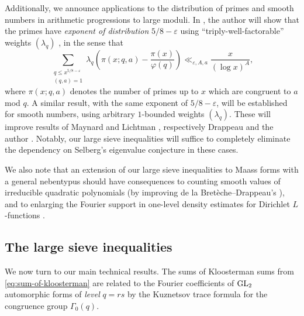 \documentclass[reqno,11pt]{amsart}
\theoremstyle{remark}
\newtheorem*{remark}{Remark}
\numberwithin{equation}{section}
\newcommand{\GL}{\textnormal{GL}}
\newcommand{\eps}{\varepsilon}
\begin{document}
Additionally, we announce applications to the distribution of primes and smooth numbers in arithmetic progressions to large moduli. In \cite{pascadi2024exponents}, the author will show that the primes have \emph{exponent of distribution} $5/8-\eps$ using ``triply-well-factorable'' weights $(\lambda_q)$ \cite{maynard2020primesII}, in the sense that 
\[
    \sum_{\substack{q \le x^{5/8-\eps} \\ (q, a) = 1}} 
    \lambda_q \left(\pi(x; q, a) - \frac{\pi(x)}{\varphi(q)}\right) \ll_{\eps,A,a}
    \frac{x}{(\log x)^A},
\]
where $\pi(x; q, a)$ denotes the number of primes up to $x$ which are congruent to $a$ mod $q$. A similar result, with the same exponent of $5/8-\eps$, will be established for smooth numbers, using arbitrary $1$-bounded weights $(\lambda_q)$. These will improve results of Maynard \cite{maynard2020primesII} and Lichtman \cite{lichtman2023primes}, respectively Drappeau \cite{drappeau2015theoremes} and the author \cite{pascadi2023smooth}. Notably, our large sieve inequalities will suffice to completely eliminate the dependency on Selberg's eigenvalue conjecture in these cases.

We also note that an extension of our large sieve inequalities to Maass forms with a general nebentypus should have consequences to counting smooth values of irreducible quadratic polynomials \cite{de2020niveau,harman2008values,harmantwo2024} (by improving de la Bret\`eche--Drappeau's \cite[Th\'eor\`eme 5.2]{de2020niveau}), and to enlarging the Fourier support in one-level density estimates for Dirichlet $L$-functions \cite{drappeau2023one}.








\subsection{The large sieve inequalities}

We now turn to our main technical results. The sums of Kloosterman sums from \cref{eq:sum-of-kloosterman} are related to the Fourier coefficients of $\GL_2$ automorphic forms of \emph{level} $q = rs$ by the Kuznetsov trace formula \cite{kuznetsov1980petersson,deshouillers1982kloosterman} for the congruence group $\Gamma_0(q)$.
\end{document}
